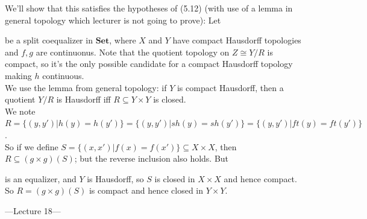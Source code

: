\documentclass[a4paper]{article}
\begin{document}
\begin{eg}

    We'll show that this satisfies the hypotheses of (5.12) (with use of a lemma in general topology which lecturer is not going to prove): Let 
    be a split coequalizer in $\mathbf{Set}$, where $X$ and $Y$ have compact Hausdorff topologies and $f,g$ are continuonus. Note that the quotient topology on $Z \cong Y/R$ is compact, so it's the only possible candidate for a compact Hausdorff topology making $h$ continuous.\\
    We use the lemma from general topology: if $Y$ is compact Hausdorff, then a quotient $Y/R$ is Hausdorff iff $R \subseteq Y \times Y$ is closed.\\
    We note $R = \{(y,y') | h(y) = h(y') \} = \{(y,y') | sh(y) = sh(y')\} = \{(y,y') | ft(y) = ft(y')\}$.\\
    So if we define $S = \{(x,x')|f(x) = f(x')\} \subseteq X \times X$, then $R \subseteq (g \times g) (S)$; but the reverse inclusion also holds. But 
    is an equalizer, and $Y$ is Hausdorff, so $S$ is closed in $X \times X$ and hence compact. So $R=(g \times g)(S)$ is compact and hence closed in $Y \times Y$.
\end{eg}

---Lecture 18---
\end{document}

